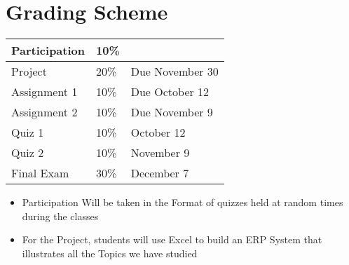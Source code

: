 \section * {Grading Scheme }
\setlength{\tabcolsep}{20pt}
\renewcommand{\arraystretch}{1.5}

\begin{tabular}{ l l  l  }

\hline
 Participation & 10\% \\ 
 \hline
 Project      &  20\%  &  Due November 30 \\  
 \hline
 Assignment 1  &    10\%  &  Due October 12   \\
 \hline
 Assignment 2  &    10\%  &  Due November 9   \\
 \hline
 Quiz 1  &    10\%  &  October 12   \\
 \hline
 Quiz 2  &    10\%  &  November 9   \\ 
 \hline
 Final Exam  &    30\%  &  December 7   \\ 
 \hline
\end{tabular}
\begin{itemize}
    \item Participation Will be taken in the Format of quizzes held at random times during the classes
    \item For the Project, students will use Excel to build an ERP System that illustrates all the Topics we have studied      
\end{itemize}